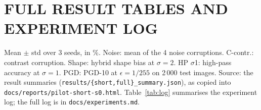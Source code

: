 \documentclass[a4paper,12pt]{report}
\begin{document}



\appendix
\chapter{FULL RESULT TABLES AND EXPERIMENT LOG}

Mean $\pm$ std over 3 seeds, in \%. Noise: mean of the 4 noise corruptions. C-contr.: contrast corruption. Shape: hybrid shape bias at $\sigma=2$. HP $\sigma$1: high-pass accuracy at $\sigma=1$. PGD: PGD-10 at $\epsilon=1/255$ on 2\,000 test images. Source: the result summaries (\texttt{results/\{short,full\}\_summary.json}), as copied into \texttt{docs/reports/pilot-short-s0.html}. Table~\ref{tab:log} summarises the experiment log; the full log is in \texttt{docs/experiments.md}.

\begin{table}[htbp]
\caption{All 20 conditions at 30 epochs.}
\label{tab:full30}
\begin{center}
\footnotesize
\setlength{\tabcolsep}{1.6pt}

\end{center}
\end{table}

\begin{table}[htbp]
\caption{The seven main conditions at 100 epochs.}
\label{tab:full100}
\begin{center}
\footnotesize
\setlength{\tabcolsep}{1.6pt}

\end{center}
\end{table}
\end{document}
